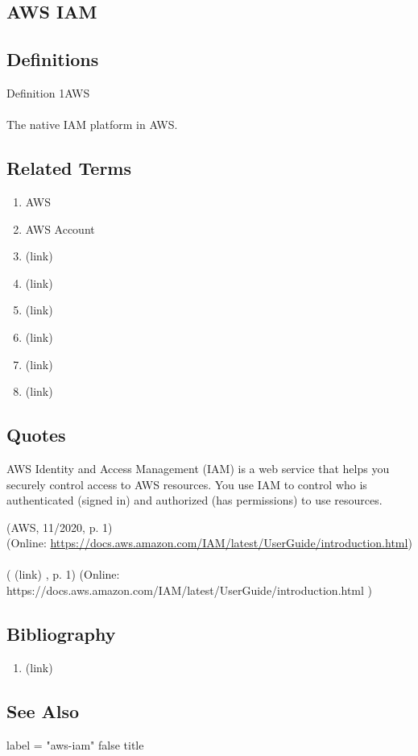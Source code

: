 \newpage \subsection*{AWS IAM } \subsection*{Definitions } \begin{DIC_Def}{Definition 1AWS }{} \paragraph{} The native IAM platform in AWS.  \end{DIC_Def} \subsection*{Related Terms } \begin{enumerate} \item  AWS  \item  AWS Account  \item  (link) \href{AWS Account Root User (Dictionary Entry) }{ }   \item  (link) \href{AWS IAM Group (Dictionary Entry) }{ }   \item  (link) \href{AWS IAM Policy (Dictionary Entry) }{ }   \item  (link) \href{AWS IAM Role (Dictionary Entry) }{ }   \item  (link) \href{AWS IAM Temporary Security Credentials (Dictionary Entry) }{ }   \item  (link) \href{AWS IAM User (Dictionary Entry) }{ }   \end{enumerate} \subsection*{Quotes } \begin{DIC_BlockQuote} AWS Identity and Access Management (IAM) is a web service that helps you securely control access to AWS resources. You use IAM to control who is authenticated (signed in) and authorized (has permissions) to use resources.  \end{DIC_BlockQuote} (AWS, 11/2020, p. 1)\\ (Online: \url{https://docs.aws.amazon.com/IAM/latest/UserGuide/introduction.html})  \paragraph{} (  (link) \href{AWS, 11/2020 }{ } , p. 1)  (Online:  https://docs.aws.amazon.com/IAM/latest/UserGuide/introduction.html  )  \subsection*{Bibliography } \begin{enumerate} \item  (link) \href{AWS, 11/2020 }{ }   \end{enumerate} \subsection*{See Also } label = "aws-iam"  false  title  